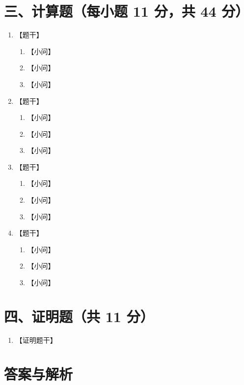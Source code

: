 \documentclass[UTF8,12pt,a4paper]{ctexart}
\begin{document}
\section*{三、计算题（每小题 11 分，共 44 分）}
\begin{enumerate}
\item 【题干】
\begin{enumerate}[label=(\arabic*)]
\item 【小问】
\item 【小问】
\item 【小问】
\end{enumerate}
\item 【题干】
\begin{enumerate}[label=(\arabic*)]
\item 【小问】
\item 【小问】
\item 【小问】
\end{enumerate}
\item 【题干】
\begin{enumerate}[label=(\arabic*)]
\item 【小问】
\item 【小问】
\item 【小问】
\end{enumerate}
\item 【题干】
\begin{enumerate}[label=(\arabic*)]
\item 【小问】
\item 【小问】
\item 【小问】
\end{enumerate}
\end{enumerate}

\section*{四、证明题（共 11 分）}
\begin{enumerate}
\item 【证明题干】
\end{enumerate}

\newpage
\section*{答案与解析}
\end{document}
